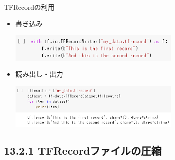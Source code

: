 \documentclass[aspectratio=169, dvipdfmx, 14pt, xcolor={svgnames,dvipsnames}, t]{beamer}
\begin{document}

\begin{frame}{TFRecordの利用}

  \begin{itemize}
    \tightlist
    \item
          書き込み\\
          \begin{center}
            \includegraphics[width=240pt]{img/hands-on-ml_13-2_1.png}
          \end{center}
    \item
          読み出し・出力\\
          \begin{center}
            \includegraphics[width=240pt]{img/hands-on-ml_13-2_2.png}
          \end{center}
  \end{itemize}

\end{frame}


\hypertarget{tfrecordux30d5ux30a1ux30a4ux30ebux306eux5727ux7e2e}{%
  \subsection{13.2.1 TFRecordファイルの圧縮}\label{tfrecordux30d5ux30a1ux30a4ux30ebux306eux5727ux7e2e}}

\end{document}
